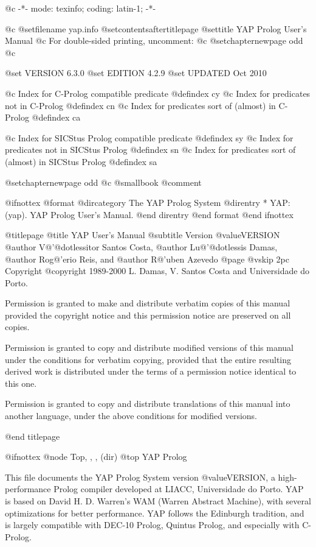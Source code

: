  @c -*- mode: texinfo; coding: latin-1; -*-

@c %
@setfilename yap.info
@setcontentsaftertitlepage
@settitle YAP Prolog User's Manual
@c For double-sided printing, uncomment:
@c @setchapternewpage odd
@c %

@set VERSION 6.3.0
@set EDITION 4.2.9
@set UPDATED Oct 2010

@c Index for C-Prolog compatible predicate
@defindex cy
@c Index for predicates not in C-Prolog
@defindex cn
@c Index for predicates sort of (almost) in C-Prolog
@defindex ca

@c Index for SICStus Prolog compatible predicate
@defindex sy
@c Index for predicates not in SICStus Prolog
@defindex sn
@c Index for predicates sort of (almost) in SICStus Prolog
@defindex sa


@setchapternewpage odd
@c @smallbook
@comment %

@ifnottex
@format
@dircategory The YAP Prolog System
@direntry
* YAP: (yap).           YAP Prolog User's Manual.
@end direntry
@end format
@end ifnottex

@titlepage
@title YAP User's Manual
@subtitle Version @value{VERSION}
@author V@'{@dotless{i}}tor Santos Costa,
@author Lu@'{@dotless{i}}s Damas,
@author Rog@'erio Reis, and
@author R@'uben Azevedo
@page
@vskip 2pc
Copyright @copyright{} 1989-2000 L. Damas, V. Santos Costa and Universidade
do Porto.

Permission is granted to make and distribute verbatim copies of
this manual provided the copyright notice and this permission notice
are preserved on all copies.

Permission is granted to copy and distribute modified versions of this
manual under the conditions for verbatim copying, provided that the entire
resulting derived work is distributed under the terms of a permission
notice identical to this one.

Permission is granted to copy and distribute translations of this manual
into another language, under the above conditions for modified versions.

@end titlepage

@ifnottex
@node Top, , , (dir)
@top YAP Prolog

This file documents the YAP Prolog System version @value{VERSION}, a
high-performance Prolog compiler developed at LIACC, Universidade do
Porto. YAP is based on David H. D. Warren's WAM (Warren Abstract
Machine), with several optimizations for better performance. YAP follows
the Edinburgh tradition, and is largely compatible with DEC-10 Prolog,
Quintus Prolog, and especially with C-Prolog.

